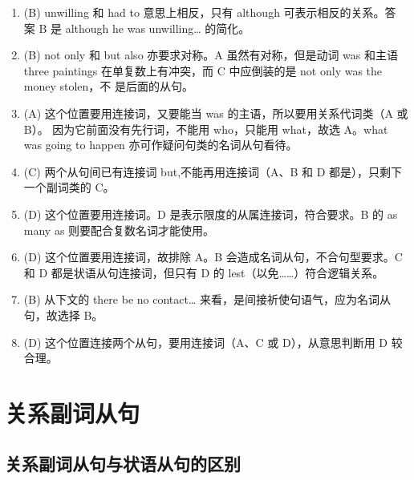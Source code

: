 \begin{enumerate}
\item (B) unwilling 和 had to 意思上相反，只有 although 可表示相反的关系。答
  案 B 是 although he was unwilling… 的简化。

\item (B) not only 和 but also 亦要求对称。A 虽然有对称，但是动词 was 和主语 three
  paintings 在单复数上有冲突，而 C 中应倒装的是 not only was the money stolen，不
  是后面的从句。


\item (A) 这个位置要用连接词，又要能当 was 的主语，所以要用关系代词类（A 或 B）。
  因为它前面没有先行词，不能用 who，只能用 what，故选 A。what was going to
  happen 亦可作疑问句类的名词从句看待。

\item  (C) 两个从句间已有连接词 but,不能再用连接词（A、B 和 D 都是），只剩下一个副词类的 C。

\item (D) 这个位置要用连接词。D 是表示限度的从属连接词，符合要求。B 的 as many as 则要配合复数名词才能使用。
\item (D) 这个位置要用连接词，故排除 A。B 会造成名词从句，不合句型要求。C 和 D 都是状语从句连接词，但只有 D 的 lest（以免……）符合逻辑关系。
\item (B) 从下文的 there be no contact… 来看，是间接祈使句语气，应为名词从句，故选择 B。

\item (D) 这个位置连接两个从句，要用连接词（A、C 或 D），从意思判断用 D 较合理。
\end{enumerate}

\chapter{关系副词从句}

\section{关系副词从句与状语从句的区别}

